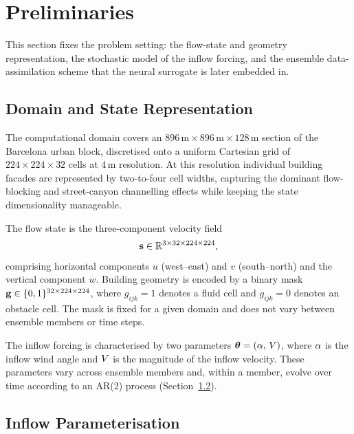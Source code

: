 \section{Preliminaries}
\label{sec:prelim}

This section fixes the problem setting: the flow-state and geometry
representation, the stochastic model of the inflow forcing, and the ensemble
data-assimilation scheme that the neural surrogate is later embedded in.

\subsection{Domain and State Representation}
\label{sec:domain}

The computational domain covers an $896\,\mathrm{m} \times 896\,\mathrm{m}
\times 128\,\mathrm{m}$ section of the Barcelona urban block, discretised onto a
uniform Cartesian grid of $224 \times 224 \times 32$ cells at $4\,\mathrm{m}$
resolution. At this resolution individual building facades are represented by
two-to-four cell widths, capturing the dominant flow-blocking and street-canyon
channelling effects while keeping the state dimensionality manageable.

The flow state is the three-component velocity field
\begin{equation}
  \mathbf{s} \in \mathbb{R}^{3 \times 32 \times 224 \times 224},
  \label{eq:state}
\end{equation}
comprising horizontal components $u$ (west--east) and $v$ (south--north) and
the vertical component $w$. Building geometry is encoded by a binary mask
$\mathbf{g} \in \{0,1\}^{32 \times 224 \times 224}$, where $g_{ijk}=1$ denotes
a fluid cell and $g_{ijk}=0$ denotes an obstacle cell. The mask is fixed for
a given domain and does not vary between ensemble members or time steps.

The inflow forcing is characterised by two parameters
$\boldsymbol{\theta} = (\alpha,\,V)$,
where $\alpha$ is the inflow wind angle and $V$ is the magnitude of the inflow
velocity. These
parameters vary across ensemble members and, within a member, evolve over time
according to an AR(2) process (Section~\ref{sec:prior}).

\subsection{Inflow Parameterisation}
\label{sec:prior}

